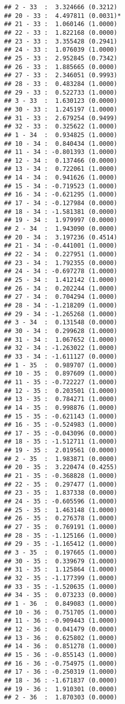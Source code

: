 \documentclass[12pt,]{article}
\begin{document}
\begin{verbatim}
## 2 - 33  :  3.324666 (0.3212)
## 20 - 33 :  4.497811 (0.0031)*
## 21 - 33 :  1.060146 (1.0000)
## 22 - 33 :  1.822168 (0.0000)
## 23 - 33 :  3.355428 (0.2941)
## 24 - 33 :  1.076039 (1.0000)
## 25 - 33 :  2.952845 (0.7342)
## 26 - 33 :  1.885665 (0.0000)
## 27 - 33 :  2.346051 (0.9993)
## 28 - 33 :  0.483284 (1.0000)
## 29 - 33 :  0.522733 (1.0000)
## 3 - 33  :  1.630123 (0.0000)
## 30 - 33 :  1.245197 (1.0000)
## 31 - 33 :  2.679254 (0.9499)
## 32 - 33 :  0.325622 (1.0000)
## 1 - 34  :  0.934825 (1.0000)
## 10 - 34 :  0.840434 (1.0000)
## 11 - 34 : -0.801393 (1.0000)
## 12 - 34 :  0.137466 (0.0000)
## 13 - 34 :  0.722061 (1.0000)
## 14 - 34 :  0.941626 (1.0000)
## 15 - 34 : -0.719523 (1.0000)
## 16 - 34 : -0.621295 (1.0000)
## 17 - 34 : -0.127984 (0.0000)
## 18 - 34 : -1.581381 (0.0000)
## 19 - 34 :  1.979997 (0.0000)
## 2 - 34  :  1.943090 (0.0000)
## 20 - 34 :  3.197236 (0.4514)
## 21 - 34 : -0.441001 (1.0000)
## 22 - 34 :  0.227951 (1.0000)
## 23 - 34 :  1.792355 (0.0000)
## 24 - 34 : -0.697278 (1.0000)
## 25 - 34 :  1.412142 (1.0000)
## 26 - 34 :  0.202244 (1.0000)
## 27 - 34 :  0.704294 (1.0000)
## 28 - 34 : -1.218209 (1.0000)
## 29 - 34 : -1.265268 (1.0000)
## 3 - 34  :  0.131548 (0.0000)
## 30 - 34 :  0.299628 (1.0000)
## 31 - 34 :  1.067652 (1.0000)
## 32 - 34 : -1.263022 (1.0000)
## 33 - 34 : -1.611127 (0.0000)
## 1 - 35  :  0.989707 (1.0000)
## 10 - 35 :  0.897609 (1.0000)
## 11 - 35 : -0.722227 (1.0000)
## 12 - 35 :  0.203501 (1.0000)
## 13 - 35 :  0.784271 (1.0000)
## 14 - 35 :  0.998876 (1.0000)
## 15 - 35 : -0.621143 (1.0000)
## 16 - 35 : -0.524983 (1.0000)
## 17 - 35 : -0.043096 (0.0000)
## 18 - 35 : -1.512711 (1.0000)
## 19 - 35 :  2.019561 (0.0000)
## 2 - 35  :  1.983871 (0.0000)
## 20 - 35 :  3.220474 (0.4255)
## 21 - 35 : -0.368828 (1.0000)
## 22 - 35 :  0.297477 (1.0000)
## 23 - 35 :  1.837338 (0.0000)
## 24 - 35 : -0.605596 (1.0000)
## 25 - 35 :  1.463148 (1.0000)
## 26 - 35 :  0.276378 (1.0000)
## 27 - 35 :  0.769191 (1.0000)
## 28 - 35 : -1.125166 (1.0000)
## 29 - 35 : -1.165412 (1.0000)
## 3 - 35  :  0.197665 (1.0000)
## 30 - 35 :  0.339679 (1.0000)
## 31 - 35 :  1.125864 (1.0000)
## 32 - 35 : -1.177399 (1.0000)
## 33 - 35 : -1.520635 (1.0000)
## 34 - 35 :  0.073233 (0.0000)
## 1 - 36  :  0.849083 (1.0000)
## 10 - 36 :  0.751705 (1.0000)
## 11 - 36 : -0.909443 (1.0000)
## 12 - 36 :  0.041479 (0.0000)
## 13 - 36 :  0.625802 (1.0000)
## 14 - 36 :  0.851278 (1.0000)
## 15 - 36 : -0.855143 (1.0000)
## 16 - 36 : -0.754975 (1.0000)
## 17 - 36 : -0.250319 (1.0000)
## 18 - 36 : -1.671837 (0.0000)
## 19 - 36 :  1.910301 (0.0000)
## 2 - 36  :  1.870303 (0.0000)

\end{verbatim}
\end{document}
